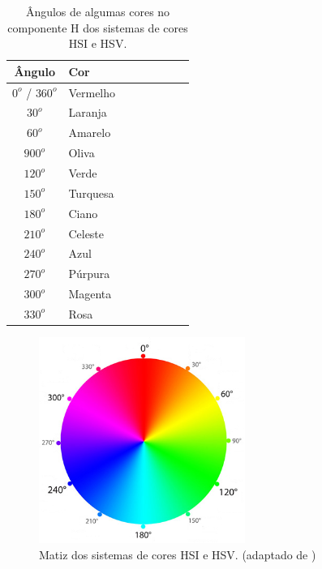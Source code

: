 \documentclass[	12pt, Times, openright, twoside, a4paper, english, brazil]{abntex2}
\begin{document}
\begin{table}[h]
\centering
\begin{tabular}{clcccccc}
\hline      

\textbf{Ângulo}     & \textbf{Cor}  \\ \hline
$0^o$ / $360^o$     & Vermelho      \\ \hline
$30^o$              & Laranja       \\ \hline
$60^o$              & Amarelo       \\ \hline
$900^o$             & Oliva         \\ \hline
$120^o$             & Verde         \\ \hline
$150^o$             & Turquesa      \\ \hline
$180^o$             & Ciano         \\ \hline
$210^o$             & Celeste       \\ \hline
$240^o$             & Azul          \\ \hline
$270^o$             & Púrpura       \\ \hline
$300^o$             & Magenta       \\ \hline
$330^o$             & Rosa          \\ \hline

\end{tabular}
\caption{Ângulos de algumas cores no componente H dos sistemas de cores HSI e HSV.}
\label{tab:coresEmH}
\end{table}

\begin{figure}[!htb]
\centering \includegraphics[width=0.60\textwidth]{figuraColorsH.PNG}
\caption{Matiz dos sistemas de cores HSI e HSV. (adaptado de ) \label{fig:figuraColorsH}}
\end{figure}
\end{document}

